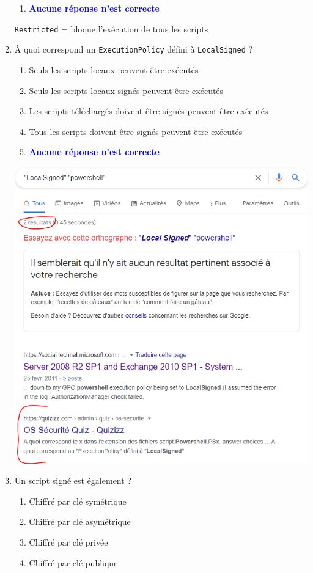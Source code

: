 \documentclass[a4paper]{article}
\begin{document}
\begin{enumerate}
\begin{enumerate}
        \item \textcolor{blue}{\textbf{Aucune réponse n'est correcte}}
    \end{enumerate}
    \begin{example} \texttt{Restricted} = bloque l'exécution de tous les scripts \end{example}
    \item À quoi correspond un \texttt{ExecutionPolicy} défini à \texttt{LocalSigned} ?
    \begin{enumerate}
        \item Seuls les scripts locaux peuvent être exécutés
        \item Seuls les scripts locaux signés peuvent être exécutés
        \item Les scripts téléchargés doivent être signés peuvent être exécutés
        \item Tous les scripts doivent être signés peuvent être exécutés
        \item \textcolor{blue}{\textbf{Aucune réponse n'est correcte}}
    \end{enumerate}
    \begin{example} \includegraphics[width=0.65\linewidth]{images/LocalSigned.PNG} \end{example}
    \item Un script signé est également ?
    \begin{enumerate}
        \item Chiffré par clé symétrique
        \item Chiffré par clé asymétrique
        \item Chiffré par clé privée
        \item Chiffré par clé publique

\end{enumerate}
\end{enumerate}
\end{document}
